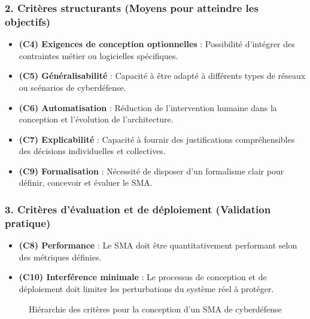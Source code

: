 \documentclass[ twoside,openright,titlepage,numbers=noenddot,headinclude,%
                footinclude=true,cleardoublepage=empty,abstractoff, %
                BCOR=5mm,paper=a4,fontsize=11pt,%
                french,american,%
                ]{scrreprt}
\begin{document}
\subsubsection*{2. Critères structurants (Moyens pour atteindre les objectifs)}

\begin{itemize}
  \item \textbf{(C4) Exigences de conception optionnelles} : Possibilité d’intégrer des contraintes métier ou logicielles spécifiques.
  \item \textbf{(C5) Généralisabilité} : Capacité à être adapté à différents types de réseaux ou scénarios de cyberdéfense.
  \item \textbf{(C6) Automatisation} : Réduction de l’intervention humaine dans la conception et l’évolution de l’architecture.
  \item \textbf{(C7) Explicabilité} : Capacité à fournir des justifications compréhensibles des décisions individuelles et collectives.
  \item \textbf{(C9) Formalisation} : Nécessité de disposer d’un formalisme clair pour définir, concevoir et évaluer le SMA.
\end{itemize}

\subsubsection*{3. Critères d’évaluation et de déploiement (Validation pratique)}

\begin{itemize}
  \item \textbf{(C8) Performance} : Le SMA doit être quantitativement performant selon des métriques définies.
  \item \textbf{(C10) Interférence minimale} : Le processus de conception et de déploiement doit limiter les perturbations du système réel à protéger.
\end{itemize}

\begin{figure}[H]
\centering
{}
\caption{Hiérarchie des critères pour la conception d’un SMA de cyberdéfense}
\end{figure}
\end{document}
